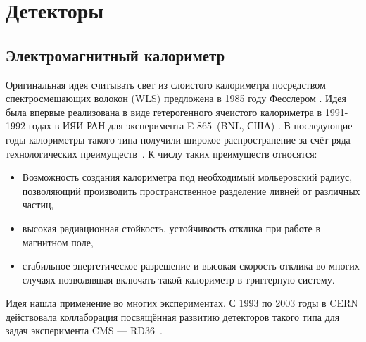 \section{Детекторы}

\subsection{Электромагнитный калориметр}

Оригинальная идея считывать свет из слоистого калориметра посредством
спектросмещающих волокон (WLS) предложена в 1985 году Фесслером \cite{Fessler-Shashlik-1985}.
Идея была впервые реализована в виде гетерогенного ячеистого калориметра в
1991-1992 годах в ИЯИ РАН для эксперимента E-865~(BNL, США) \cite{BADIER199474}.
В последующие годы калориметры такого типа получили широкое распространение за
счёт ряда технологических преимуществ~\cite{grupenDetectors2008}.
К числу таких преимуществ относятся:
\begin{itemize}
    \item Возможность создания калориметра под необходимый мольеровский радиус,
    позволяющий производить пространственное разделение ливней от различных частиц, \item высокая радиационная стойкость, устойчивость отклика при работе в магнитном поле,
    \item стабильное энергетическое разрешение и высокая скорость отклика во
    многих случаях позволявшая включать такой калориметр в триггерную систему.
\end{itemize}

Идея нашла применение во многих экспериментах.
С 1993 по 2003 годы в CERN действовала коллаборация посвящённая
развитию детекторов такого типа для задач эксперимента
CMS --- RD36~\cite{rd36-shashlik-1996}.

